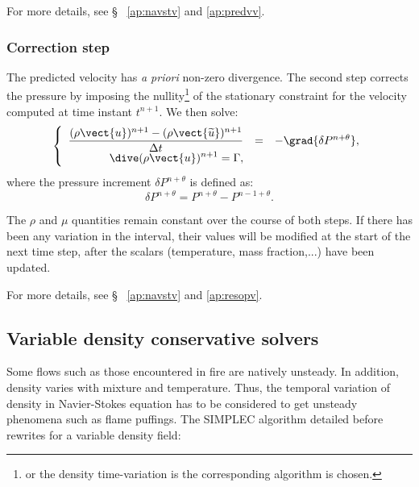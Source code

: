 For more details, see \S~ \ref{ap:navstv} and \ref{ap:predvv}.

\subsubsection{Correction step}
The predicted velocity has \emph{a priori} non-zero divergence. The second step
corrects the pressure by imposing the nullity\footnote{or the density time-variation
is the corresponding algorithm is chosen.}
of the stationary constraint for
the velocity computed at time instant ${t^{n+1}}$.
We then solve:
\begin{equation}\label{eq:timstp:c0_correction_step}
\left\{\begin{array}{ r c l}
\displaystyle \dfrac{(\rho\vect{u})^{n+1}-(\rho\vect{\widetilde{u}})^{n+1}}{\Delta t} &=&
-\grad{\delta P^{n+\theta}} ,\\
\displaystyle
\dive(\rho\vect{u})^{n+1} = \Gamma ,\\
\end{array}\right.
\end{equation}
where the pressure increment $\delta P^{n+\theta}$ is defined as:
\begin{equation}
\delta P^{n+\theta}=P^{n+\theta}-P^{n-1+\theta} .
\end{equation}

\begin{remark}
The  $\rho$ and $\mu$ quantities remain constant over the course of both
steps. If there has been any variation in the interval, their values will be
modified at the start of the next time step, after the scalars
(temperature, mass fraction,...) have been updated.
\end{remark}


For more details, see \S~ \ref{ap:navstv} and \ref{ap:resopv}.

\subsection{Variable density conservative solvers}

Some flows such as those encountered in fire are natively unsteady.
In addition, density varies with mixture and temperature. Thus, the temporal
variation of density in Navier-Stokes equation has to be considered to get
unsteady phenomena such as flame puffings.
The SIMPLEC algorithm detailed before rewrites for a variable density field:

